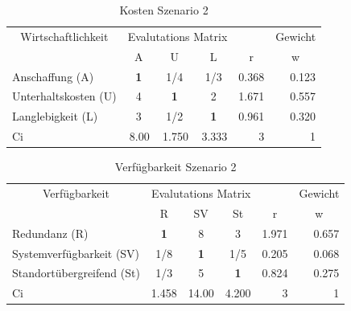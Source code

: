 \begin{table}[htbp]
\caption{Kosten Szenario 2}
\begin{tabular}{|l|c|c|c|r|r|}
\hline
\multicolumn{ 1}{|c|}{Wirtschaftlichkeit} & \multicolumn{ 3}{c|}{Evalutations Matrix} & \multicolumn{1}{l|}{} & \multicolumn{1}{l|}{Gewicht} \\ \cline{ 2- 6}
\multicolumn{ 1}{|c|}{} & A & U & L & \multicolumn{1}{c|}{r} & \multicolumn{1}{c|}{w} \\ \hline
Anschaffung (A) & \textbf{1} &  1/4 &  1/3 & 0.368 & 0.123 \\ \hline
Unterhaltskosten (U)  & 4 & \textbf{1} & 2 & 1.671 & 0.557 \\ \hline
Langlebigkeit (L) & 3 &  1/2 & \textbf{1} & 0.961 & 0.320 \\ \hline \hline 
Ci & \multicolumn{1}{r|}{8.00} & \multicolumn{1}{r|}{1.750} & \multicolumn{1}{r|}{3.333} & 3 & 1 \\ \hline
\end{tabular}
\label{AHPKostenS2}
\end{table}

\begin{table}[htbp]
\caption{Verfügbarkeit Szenario 2}
\begin{tabular}{|p{7.1cm}|c|c|c|r|r|}
\hline
\multicolumn{ 1}{|c|}{Verfügbarkeit} & \multicolumn{ 3}{c|}{Evalutations Matrix} & \multicolumn{1}{l|}{} & \multicolumn{1}{l|}{Gewicht} \\ \cline{ 2- 6}
\multicolumn{ 1}{|c|}{} & R & SV & St & \multicolumn{1}{c|}{r} & \multicolumn{1}{c|}{w} \\ \hline
Redundanz (R) & \textbf{1    } & 8     & 3     & 1.971 & 0.657 \\ \hline
Systemverfügbarkeit (SV) &  1/8 & \textbf{1} &  1/5 & 0.205 & 0.068 \\ \hline
Standortübergreifend (St) &  1/3 & 5     & \textbf{1} & 0.824 & 0.275 \\ \hline \hline
Ci & \multicolumn{1}{r|}{1.458} & \multicolumn{1}{r|}{14.00} & \multicolumn{1}{r|}{4.200} & 3 & 1 \\ \hline
\end{tabular}
\label{AHPVerfügbarkeitS2}
\end{table}


